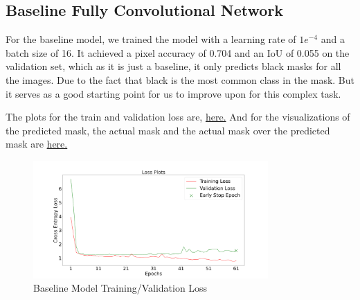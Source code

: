 \documentclass{article}
\begin{document}
\subsection{Baseline Fully Convolutional Network}
For the baseline model, we trained the model with a learning rate of $1e^{-4}$ and a batch size of 16. It achieved a pixel accuracy of 0.704 and an IoU of 0.055 on the validation set, which as it is just a baseline, it only predicts black masks for all the images. Due to the fact that black is the most common class in the mask. But it serves as a good starting point for us to improve upon for this complex task.

The plots for the train and validation loss are, \hyperref[fig:baseline_train_loss]{here.}
And for the visualizations of the predicted mask, the actual mask and the actual mask over the predicted mask are \hyperref[fig:baseline_masks_visualization]{here.}

\begin{figure}[h!]
  \centering
  \includegraphics[width=0.8\textwidth]{include/plots/base_loss.png}
  \caption{Baseline Model Training/Validation Loss}
  \label{fig:baseline_train_loss}
\end{figure}
\end{document}
